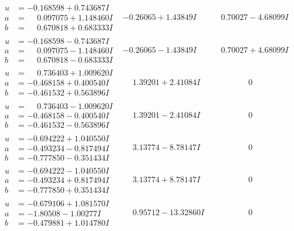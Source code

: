 \documentclass[1p]{elsarticle_modified}
\theoremstyle{definition}
\begin{document}
$$\begin{array}{c|c|c}
\begin{aligned}
u &= -0.168598 + 0.743687 I \\
a &= \phantom{-}0.097075 + 1.148460 I \\
b &= \phantom{-}0.670818 + 0.683333 I\end{aligned}
 & -0.26065 + 1.43849 I & \phantom{-}0.70027 - 4.68099 I \\ \hline\begin{aligned}
u &= -0.168598 - 0.743687 I \\
a &= \phantom{-}0.097075 - 1.148460 I \\
b &= \phantom{-}0.670818 - 0.683333 I\end{aligned}
 & -0.26065 - 1.43849 I & \phantom{-}0.70027 + 4.68099 I \\ \hline\begin{aligned}
u &= \phantom{-}0.736403 + 1.009620 I \\
a &= -0.468158 + 0.400540 I \\
b &= -0.461532 + 0.563896 I\end{aligned}
 & \phantom{-}1.39201 + 2.41084 I & \phantom{-0.000000 } 0 \\ \hline\begin{aligned}
u &= \phantom{-}0.736403 - 1.009620 I \\
a &= -0.468158 - 0.400540 I \\
b &= -0.461532 - 0.563896 I\end{aligned}
 & \phantom{-}1.39201 - 2.41084 I & \phantom{-0.000000 } 0 \\ \hline\begin{aligned}
u &= -0.694222 + 1.040550 I \\
a &= -0.493234 - 0.817494 I \\
b &= -0.777850 - 0.351434 I\end{aligned}
 & \phantom{-}3.13774 - 8.78147 I & \phantom{-0.000000 } 0 \\ \hline\begin{aligned}
u &= -0.694222 - 1.040550 I \\
a &= -0.493234 + 0.817494 I \\
b &= -0.777850 + 0.351434 I\end{aligned}
 & \phantom{-}3.13774 + 8.78147 I & \phantom{-0.000000 } 0 \\ \hline\begin{aligned}
u &= -0.679106 + 1.081570 I \\
a &= -1.80508 - 1.00277 I \\
b &= -0.479881 + 1.014780 I\end{aligned}
 & \phantom{-}0.95712 - 13.32860 I & \phantom{-0.000000 } 0 \\ \hline\begin{aligned}

\end{aligned}
\end{array}$$
\end{document}
